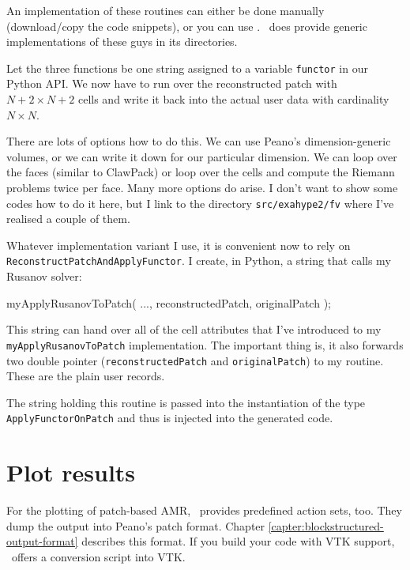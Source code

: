 \begin{remark}
 An implementation of these routines can either be done manually (download/copy
 the code snippets), or you can use \ExaHyPE. \ExaHyPE\ does provide generic
 implementations of these guys in its directories.
\end{remark}

\noindent
Let the three functions be one string assigned to a variable
\texttt{functor} in our Python API. 
We now have to run over the reconstructed patch with $N+2 \times N+2$ cells and
write it back into the actual user data with cardinality $N \times N$.


There are lots of options how to do this. 
We can use Peano's dimension-generic volumes, or we can write it down for our
particular dimension.
We can loop over the faces (similar to ClawPack) or loop over the cells and
compute the Riemann problems twice per face.
Many more options do arise.
I don't want to show some codes how to do it here, but I link to the directory
\texttt{src/exahype2/fv} where I've realised a couple of them.


Whatever implementation variant I use, it is convenient now to rely on
\linebreak \texttt{ReconstructPatchAndApplyFunctor}. 
I create, in Python, a string that calls my Rusanov solver: 

\begin{code}
  myApplyRusanovToPatch( ..., reconstructedPatch, originalPatch );
\end{code}

\noindent
This string can hand over all of the cell attributes that I've introduced to my
\linebreak \texttt{myApplyRusanovToPatch} implementation.
The important thing is, it also forwards two double pointer
(\texttt{reconstructedPatch} and \texttt{originalPatch}) to my routine.
These are the plain user records. 

The string holding this routine is passed into the instantiation of the type
\linebreak \texttt{ApplyFunctorOnPatch} and thus is injected into the generated code.
 
 
\section{Plot results}

For the plotting of patch-based AMR, \Peano\ provides predefined action sets,
too.
They dump the output into Peano's patch format.
Chapter \ref{capter:blockstructured-output-format} describes this format. 
If you build your code with VTK support, \Peano\ offers a conversion script into
VTK.



